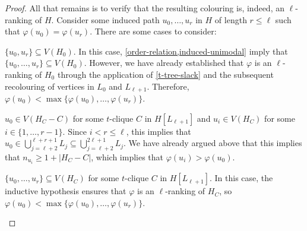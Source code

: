 \documentclass[kpfonts]{patmorin}
\theoremstyle{named}
\begin{document}
\begin{proof}
    All that remains is to verify that the resulting colouring is, indeed, an $\ell$-ranking of $H$.  Consider some induced path $u_0,\ldots,u_r$ in $H$ of length $r\le\ell$ such that $\varphi(u_0)=\varphi(u_r)$.  There are some cases to consider:

    \begin{compactenum}
        \item $\{u_0,u_r\}\subseteq V(H_0)$. In this case, \cref{order-relation,induced-unimodal} imply that $\{u_0,\ldots,u_r\}\subseteq V(H_0)$.  However, we have already established that $\varphi$ is an $\ell$-ranking of $H_0$ through the application of \cref{t-tree-slack} and the subsequent recolouring of vertices in $L_0$ and $L_{\ell+1}$.  Therefore, $\varphi(u_0)<\max\{\varphi(u_0),\ldots,\varphi(u_r)\}$.

        \item $u_0\in V(H_C-C)$ for some $t$-clique $C$ in $H[L_{\ell+1}]$ and $u_i\in V(H_C)$ for some $i\in\{1,\ldots,r-1\}$.  Since $i<r\le\ell$, this implies that $u_0\in\bigcup_{j=\ell+2}^{\ell+r+1} L_j\subseteq \bigcup_{j=\ell+2}^{2\ell+1}L_j$.  We have already argued above that this implies that $n_{u_i} \ge 1+|H_C-C|$, which implies that $\varphi(u_i)>\varphi(u_0)$.

        \item $\{u_0,\ldots,u_r\}\subseteq V(H_C)$ for some $t$-clique $C$ in $H[L_{\ell+1}]$.  In this case, the inductive hypothesis ensures that $\varphi$ is an $\ell$-ranking of $H_C$, so $\varphi(u_0)<\max\{\varphi(u_0),\ldots,\varphi(u_r)\}$. \qedhere
    \end{compactenum}
\end{proof}
\end{document}

